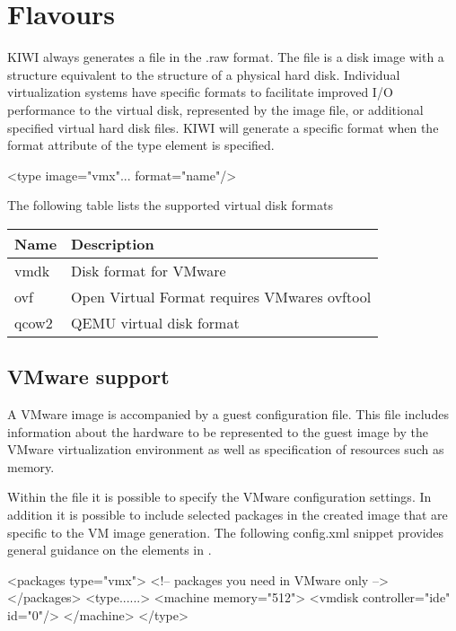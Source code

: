 \section{Flavours}

KIWI always generates a file in the .raw format. The  file is a disk
image with a structure equivalent to the structure of a physical hard disk. 
Individual virtualization systems have specific formats to facilitate
improved I/O performance to the virtual disk, represented by the image file,
or additional specified virtual hard disk files. KIWI will generate a 
specific format when the format attribute of the type element is specified.


\begin{xml}
<type image="vmx"... format="name"/>
\end{xml}

The following table lists the supported virtual disk formats

\begin{tabular}[h]{|p{2cm}|p{9cm}|}
\hline
\textbf{Name} & \textbf{Description} \\
\hline
vmdk        & Disk format for VMware \\
ovf         & Open Virtual Format requires VMwares ovftool \\
qcow2       & QEMU virtual disk format  \\
\hline
\end{tabular}

\subsection{VMware support}

A VMware image is accompanied by a guest configuration file. This file 
includes information about the hardware to be represented to the guest 
image by the VMware virtualization environment as well as specification
of resources such as memory. 

Within the  file it is possible to specify the VMware configuration
settings. In addition it is possible to include selected packages in the 
created image that are specific to the VM image generation. The following
config.xml snippet provides general guidance on the elements in .

\begin{xml}
<packages type="vmx">
   <!-- packages you need in VMware only -->
</packages>
<type......>
   <machine memory="512">
      <vmdisk controller="ide" id="0"/>
   </machine>
</type>
\end{xml}


